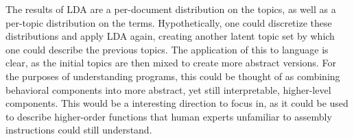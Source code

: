 The results of LDA are a per-document distribution on the topics, as well as a per-topic distribution on the terms. Hypothetically, one could discretize these distributions and apply LDA again, creating another latent topic set by which one could describe the previous topics. The application of this to language is clear, as the initial topics are then mixed to create more abstract versions. For the purposes of understanding programs, this could be thought of as combining behavioral components into more abstract, yet still interpretable, higher-level components. This would be a interesting direction to focus in, as it could be used to describe higher-order functions that human experts unfamiliar to assembly instructions could still understand.